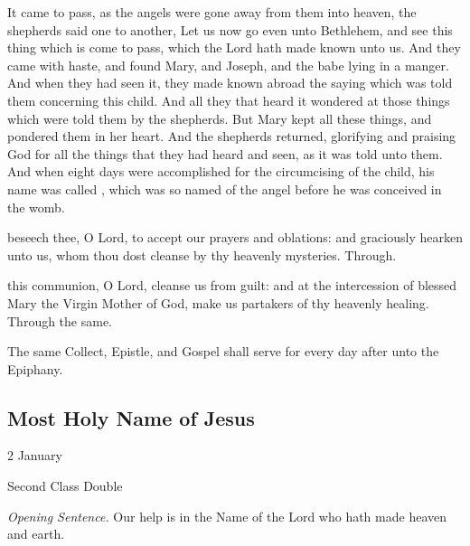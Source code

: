 
 It came to pass, as the angels were gone away from them into heaven, the shepherds said one to another, Let us now go even unto Bethlehem, and see this thing which is come to pass, which the Lord hath made known unto us. And they came with haste, and found Mary, and Joseph, and the babe lying in a manger. And when they had seen it, they made known abroad the saying which was told them concerning this child. And all they that heard it wondered at those things which were told them by the shepherds. But Mary kept all these things, and pondered them in her heart. And the shepherds returned, glorifying and praising God for all the things that they had heard and seen, as it was told unto them. And when eight days were accomplished for the circumcising of the child, his name was called , which was so named of the angel before he was conceived in the womb.


\secret
{} beseech thee, O Lord, to accept our prayers and oblations: and graciously hearken unto us, whom thou dost cleanse by thy heavenly mysteries. Through.


\postcommunion
{} this communion, O Lord, cleanse us from guilt: and at the intercession of blessed Mary the Virgin Mother of God, make us partakers of thy heavenly healing. Through the same.

\begin{rubric}
    The same Collect, Epistle, and Gospel shall serve for every day after unto the Epiphany.
\end{rubric}


\clearpage
\subsection{Most Holy Name of Jesus}\label{MostHolyName}
\begin{inhead}
{2 January}\par
{Second Class Double}
\end{inhead}
\par\noindent
\textit{Opening Sentence.} Our help is in the Name of the Lord who hath made heaven and earth.

